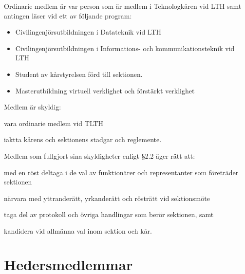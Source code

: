 \documentclass[stadgar]{dsekprotokoll}
\begin{document}
\begin{stadgeavsnitt}


 Ordinarie medlem är var person som är medlem i Teknologkåren vid LTH samt antingen läser vid
ett av följande program:
\begin{itemize}
\item Civilingenjörsutbildningen i Datateknik vid LTH
\item Civilingenjörsutbildningen i Informations- och kommunikationsteknik vid LTH
\item Student av kårstyrelsen förd till sektionen.
\item Masterutbildning virtuell verklighet och förstärkt verklighet
\end{itemize}


Medlem är skyldig:
\begin{attlista}
\item vara ordinarie medlem vid TLTH
\item iaktta kårens och sektionens stadgar och reglemente.
\end{attlista}


Medlem som fullgjort sina skyldigheter enligt \S2.2 äger rätt att:
\begin{attlista}
\item med en röst deltaga i de val av funktionärer och representanter som
  företräder sektionen
\item närvara med yttranderätt, yrkanderätt och rösträtt vid sektionsmöte
\item taga del av protokoll och övriga handlingar som berör sektionen, samt
\item kandidera vid allmänna val inom sektion och kår.
\end{attlista}

\end{stadgeavsnitt}

\section{Hedersmedlemmar}
\end{document}
